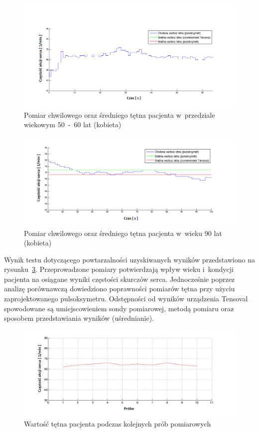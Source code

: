 \newpage
\begin{figure}[!ht]
	\centerline{\includegraphics[scale = 0.61]{graphic/50-60K}}
	\caption{Pomiar chwilowego oraz średniego tętna pacjenta w~przedziale wiekowym 50~-~60 lat (kobieta)}
	\label{rys:50-60K}
\end{figure}

\begin{figure}[!hb]
	\centerline{\includegraphics[scale = 0.61]{graphic/90L}}
	\caption{Pomiar chwilowego oraz średniego tętna pacjenta w~wieku 90 lat (kobieta)}
	\label{rys:90L}
\end{figure}
\newpage

Wynik testu dotyczącego powtarzalności uzyskiwanych wyników przedstawiono na rysunku~\ref{rys:proba}.
Przeprowadzone pomiary potwierdzają wpływ wieku i~kondycji pacjenta na osiągane wyniki częstości skurczów serca. Jednocześnie
poprzez analizę porównawczą dowiedziono poprawności pomiarów tętna przy użyciu zaprojektowanego pulsoksymetru.
Odstępności od wyników urządzenia Tensoval spowodowane są umiejscowieniem sondy pomiarowej, metodą pomiaru oraz sposobem
przedstawiania wyników (uśrednianie).
\begin{figure}[!h]
	\centerline{\includegraphics[scale = 0.6]{graphic/proba}}
	\caption{Wartość tętna pacjenta podczas kolejnych prób pomiarowych}
	\label{rys:proba}
\end{figure}


